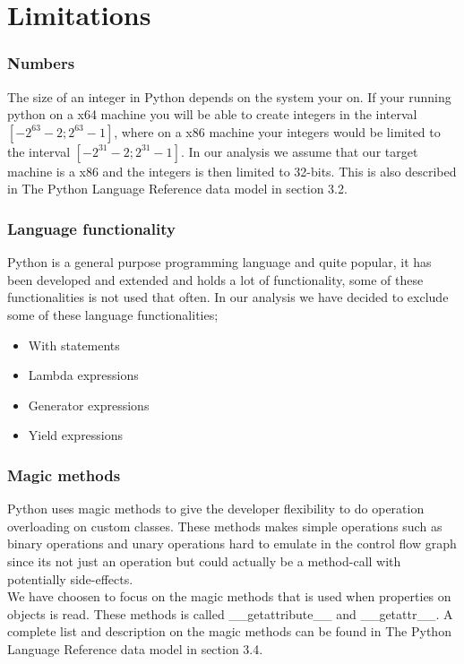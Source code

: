 \chapter{Limitations}

\subsection{Numbers}
The size of an integer in Python depends on the system your on. If your running python on a x64 machine you will be able to create integers in the interval $[-2^{63}-2;2^{63}-1]$, where on a x86 machine your integers would be limited to the interval $[-2^{31}-2;2^{31}-1]$. In our analysis we assume that our target machine is a x86 and the integers is then limited to 32-bits. This is also described in The Python Language Reference data model\cite{pyref.datamodel} in section 3.2.

\subsection{Language functionality}
Python is a general purpose programming language and quite popular, it has been developed and extended and holds a lot of functionality, some of these functionalities is not used that often. In our analysis we have decided to exclude some of these language functionalities;
\begin{itemize}
	\item With statements
	\item Lambda expressions
	\item Generator expressions
	\item Yield expressions
\end{itemize}

\subsection{Magic methods}
Python uses magic methods to give the developer flexibility to do operation overloading on custom classes. These methods makes simple operations such as binary operations and unary operations hard to emulate in the control flow graph since its not just an operation but could actually be a method-call with potentially side-effects. \\
We have choosen to focus on the magic methods that is used when properties on objects is read. These methods is called \_\_getattribute\_\_ and \_\_getattr\_\_. A complete list and description on the magic methods can be found in The Python Language Reference data model\cite{pyref.datamodel} in section 3.4.
